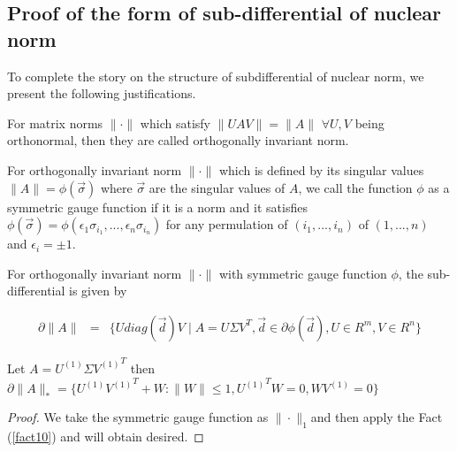\subsection{Proof of the form of sub-differential of nuclear norm } \label{sub:nuclearnorm}
To complete the story on the structure of subdifferential of nuclear norm, we present the following justifications.
\begin{definition}
For matrix norms $\|\cdot\|$ which satisfy $\|UAV\|=\|A\|$ $\forall U,V$ being orthonormal, then they are called orthogonally invariant norm.

\begin{definition}
For orthogonally invariant norm $\|\cdot\|$ which is defined by its singular values $\|A\|=\phi(\vec{\sigma})$ where $\vec{\sigma}$ are the singular values of $A$, we call the function $\phi$ as a symmetric gauge function if it is a norm and it satisfies $\phi(\vec{\sigma})=\phi(\epsilon_{1}\sigma_{i_{1}},...,\epsilon_{n}\sigma_{i_{n}})$ for any permulation of $(i_{1},...,i_{n})$ of $(1,...,n)$ and $\epsilon_{i}=\pm1$.

\begin{fact}
\label{fact10}
For orthogonally invariant norm $\|\cdot\|$ with symmetric
gauge function $\phi$, the sub-differential is given by

\begin{eqnarray*}
\partial\|A\| & = & \{Udiag(\vec{d})V\mid A=U\Sigma V^{T},\vec{d}\in\partial\phi(\vec{d}),U\in R^{m},V\in R^{n}\}
\end{eqnarray*}

\end{fact}
\end{definition}
\end{definition}

\begin{thm}
Let $A=U^{(1)}\Sigma{V^{(1)}}^{T}$ then $\partial\|A\|_{*}=\{U^{(1)}{V^{(1)}}^{T}+W:\|W\|\le1,{U^{(1)}}^{T}W=0,WV^{(1)}=0\}$
\end{thm}

\begin{proof}
We take the symmetric gauge function as $\|\cdot\|_{1}$and then apply the Fact (\ref{fact10}) and will obtain desired.
\end{proof}

